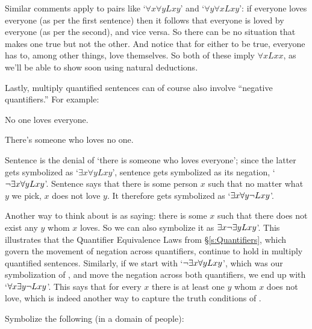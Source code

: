  Similar comments apply to pairs like `$\forall x \forall y Lxy$' and `$\forall y \forall x Lxy$': if everyone loves everyone (as per the first sentence) then it follows that everyone is loved by everyone (as per the second), and vice versa.  So there can be no situation that makes one true but not the other.  And notice that for either to be true, everyone has to, among other things, love themselves.  So both of these imply $\forall xLxx$, as we'll be able to show soon using natural deductions.

 Lastly, multiply quantified sentences can of course also involve ``negative quantifiers.''  For example:

\begin{earg}
		\item[\ex{negquan1}] No one loves everyone.
		\item[\ex{negquan2}] There's someone who loves no one.
\end{earg}
Sentence  is the denial of `there is someone who loves everyone'; since the latter gets symbolized as `$\exists x\forall yLxy$', sentence  gets symbolized as its negation, `$\neg \exists x \forall y Lxy$'.  Sentence  says that there is some person $x$ such that  no matter what $y$ we pick, $x$ does not love $y$.  It therefore gets symbolized as `$\exists x \forall y \neg Lxy$'.

Another way to think about  is as saying: there is some  $x$ such that there does not exist any $y$ whom $x$ loves.  So we can also symbolize it as $\exists x \neg \exists y Lxy$'.  This illustrates that the Quantifier Equivalence Laws from \S\ref{s:Quantifiers}, which govern the movement of negation across quantifiers, continue to hold in multiply quantified sentences.  Similarly, if we start with `$\neg \exists x \forall y Lxy$', which was our symbolization of , and move the negation across both quantifiers, we end up with `$\forall x \exists y \neg Lxy$'.  This says that for every $x$ there is at least one $y$ whom $x$ does not love, which is indeed another way to capture the truth conditions of .


\practiceproblems
\problempart Symbolize the following (in a domain of people):

